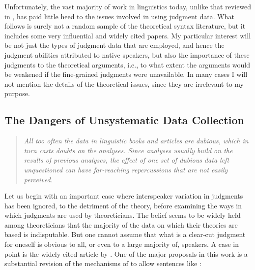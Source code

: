 Unfortunately, the vast majority of work in linguistics today, unlike that reviewed in , has paid little heed to the issues involved in using judgment data. What follows is surely not a random sample of the theoretical syntax literature, but it includes some very influential and widely cited papers. My particular interest will be not just the types of judgment data that are employed, and hence the judgment abilities attributed to native speakers, but also the importance of these judgments to the theoretical arguments, i.e., to what extent the arguments would be weakened if the fine-grained judgments were  unavailable.  In  many cases I will not mention the details of the theoretical issues, since they are irrelevant to my purpose.

\subsection{The Dangers of Unsystematic Data Collection} \label{sec:2.3.2}

\begin{quote}\itshape All too often the data in linguistic books and articles are dubious, which in turn casts doubts on the analyses. Since analyses usually build on the results of previous analyses, the effect of one set of dubious data left unquestioned can have far-reaching repercussions that are not easily perceived.\\[-2\baselineskip]
  \begin{flushright}\upshape\citep{Greenbaum1977c}
  \end{flushright}
\end{quote}

\noindent Let us begin with an important case where interspeaker variation in judgments has been ignored, to the detriment of the theory, before examining the ways in which judgments are used by theoreticians. The belief seems to be widely held among theoreticians that the majority of the data on which their theories are based is indisputable. But one cannot assume that what is a clear-cut judgment for oneself is obvious to all, or even to a large majority of, speakers. A case in point is the widely cited article by \citet{LasnikEtAl1984}. One of the major proposals in this work is a substantial revision of the mechanisms of  to allow sentences like :

